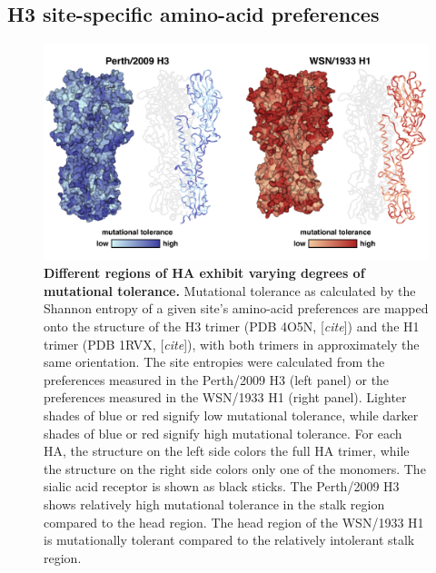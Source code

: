 \documentclass[11pt]{article}
\newcommand{\comment}[1]{{\color{red}[\textsl{#1}]}}
\begin{document}
\subsection*{H3 site-specific amino-acid preferences}

\begin{figure}
\centerline{\includegraphics[width=\textwidth]{figs/mut_tolerance/entropy_heatmap.pdf}}
\caption{\label{fig:mut_tolerance}
{\bf Different regions of HA exhibit varying degrees of mutational tolerance.}
Mutational tolerance as calculated by the Shannon entropy of a given site's amino-acid preferences are mapped onto the structure of the H3 trimer (PDB 4O5N, \comment{cite}) and the H1 trimer (PDB 1RVX, \comment{cite}), with both trimers in approximately the same orientation. 
The site entropies were calculated from the preferences measured in the Perth/2009 H3 (left panel) or the preferences measured in the WSN/1933 H1 (right panel). 
Lighter shades of blue or red signify low mutational tolerance, while darker shades of blue or red signify high mutational tolerance. 
For each HA, the structure on the left side colors the full HA trimer, while the structure on the right side colors only one of the monomers.
The sialic acid receptor is shown as black sticks.
The Perth/2009 H3 shows relatively high mutational tolerance in the stalk region compared to the head region. 
The head region of the WSN/1933 H1 is mutationally tolerant compared to the relatively intolerant stalk region. 
}
\end{figure}
\end{document}
